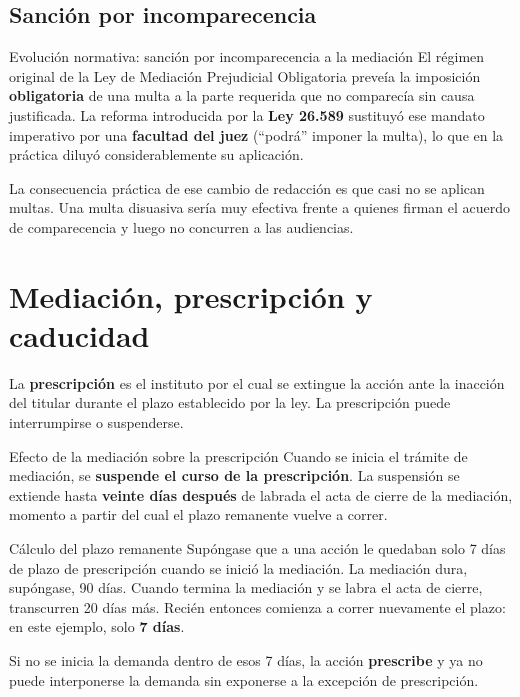 \documentclass[12pt,oneside]{book}
\begin{document}
\subsection{Sanci\'on por incomparecencia}

\begin{normref}{Evolución normativa: sanción por incomparecencia a la mediación}
El régimen original de la Ley de Mediación Prejudicial Obligatoria
preveía la imposición \textbf{obligatoria} de una multa a la parte
requerida que no comparecía sin causa justificada. La reforma
introducida por la \textbf{Ley 26.589} sustituyó ese mandato imperativo
por una \textbf{facultad del juez} (``podrá'' imponer la multa), lo
que en la práctica diluyó considerablemente su aplicación.
\end{normref}

La consecuencia práctica de ese cambio de redacción es que casi no se
aplican multas. Una multa disuasiva sería muy efectiva frente a quienes
firman el acuerdo de comparecencia y luego no concurren a las audiencias.

\section{Mediaci\'on, prescripci\'on y caducidad}

La \textbf{prescripción} es el instituto por el cual se extingue la
acción ante la inacción del titular durante el plazo establecido por
la ley. La prescripción puede interrumpirse o suspenderse.

\begin{definition}{Efecto de la mediaci\'on sobre la prescripci\'on}
Cuando se inicia el trámite de mediación, se \textbf{suspende el curso
de la prescripción}. La suspensión se extiende hasta \textbf{veinte
días después} de labrada el acta de cierre de la mediación, momento
a partir del cual el plazo remanente vuelve a correr.
\end{definition}

\begin{example}{C\'alculo del plazo remanente}
Supóngase que a una acción le quedaban solo 7 días de plazo de
prescripción cuando se inició la mediación. La mediación dura,
supóngase, 90 días. Cuando termina la mediación y se labra el acta
de cierre, transcurren 20 días más. Recién entonces comienza a correr
nuevamente el plazo: en este ejemplo, solo \textbf{7 días}.

Si no se inicia la demanda dentro de esos 7 días, la acción
\textbf{prescribe} y ya no puede interponerse la demanda sin exponerse
a la excepción de prescripción.
\end{example}
\end{document}
